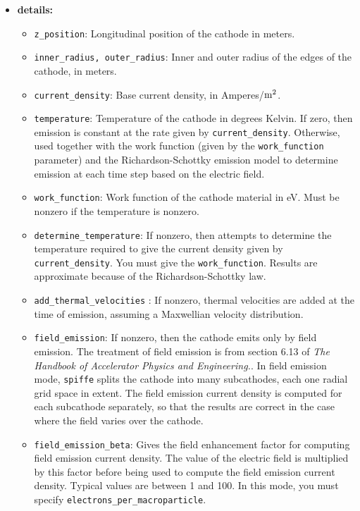 \begin{itemize}
\item {\bf details:} 
\begin{itemize}
    \item {\tt z\_position}:  Longitudinal position of the cathode in meters.
    \item {\tt inner\_radius, outer\_radius}: Inner and outer radius of the edges
        of the cathode, in meters.
    \item {\tt current\_density}: Base current density, in Amperes/${\rm m^2}$.
    \item {\tt temperature}: Temperature of the cathode in degrees Kelvin.  If
        zero, then emission is constant at the rate given by {\tt current\_density}.
        Otherwise, used together with the work function (given by the
        {\tt work\_function} parameter) and the Richardson-Schottky emission model
        to determine emission at each time step based on the electric field.
    \item {\tt work\_function}: Work function of the cathode material in eV.  Must
        be nonzero if the temperature is nonzero.
    \item {\tt determine\_temperature}: If nonzero, then attempts to determine the      
        temperature required to give the current density given by {\tt current\_density}.
        You must give the {\tt work\_function}.  Results are approximate because
        of the Richardson-Schottky law.
      \item {\tt add\_thermal\_velocities} : If nonzero, thermal velocities are
        added at the time of emission, assuming a Maxwellian velocity distribution.
    \item {\tt field\_emission}: If nonzero, then the cathode emits only by field
        emission.  The treatment of field emission is from section 6.13 of {\em
        The Handbook of Accelerator Physics and Engineering.}.  In field emission
        mode, {\tt spiffe} splits the cathode into many subcathodes, each one
        radial grid space in extent.  The field emission current density is
        computed for each subcathode separately, so that the results are correct
        in the case where the field varies over the cathode.
    \item {\tt field\_emission\_beta}: Gives the field enhancement factor for
        computing field emission current density.  The value of the electric
        field is multiplied by this factor before being used to compute the
        field emission current density.  Typical values are between 1 and 100.
        In this mode, you must specify {\tt electrons\_per\_macroparticle}.

\end{itemize}
\end{itemize}
